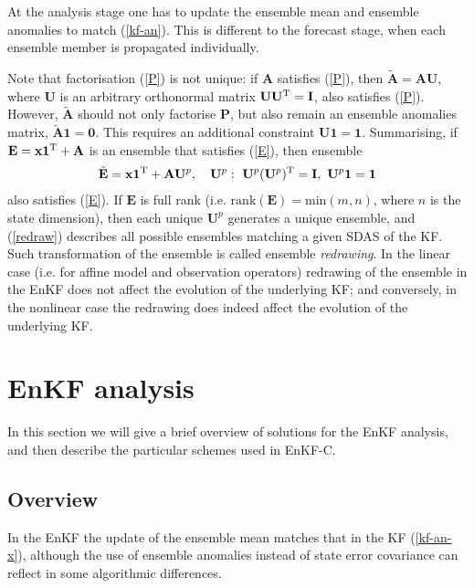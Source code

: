 \documentclass[11pt]{report}
\newcommand{\mb} {\mathbf}
\newcommand{\T}{^{\tiny \mathrm T}}
\begin{document}
At the analysis stage one has to update the ensemble mean and ensemble anomalies to match (\ref{kf-an}).
This is different to the forecast stage, when each ensemble member is propagated individually.

Note that factorisation (\ref{P}) is not unique: if $\mb A$ satisfies (\ref{P}), then $\tilde {\mb A} = \mb A \mb U$, where $\mb U$ is an arbitrary orthonormal matrix $\mb U \mb U\T = \mb I$, also satisfies (\ref{P}).
However, $\tilde{\mb A}$ should not only factorise $\mb P$, but also remain an ensemble anomalies matrix, $\tilde{\mb A} \mb 1 = \mb 0$.
This requires an additional constraint $\mb U \mb 1 = \mb 1$.
Summarising, if $\mb E = \mb x \mb 1\T + \mb A$ is an ensemble that satisfies (\ref{E}), then ensemble
\begin{align}
  \label{redraw}
  \tilde{\mb E} = \mb x \mb 1\T + \mb A \mb U^p, \quad \mb U^p:\ \mb U^p (\mb U^p)\T = \mb I,\ \mb U^p \mb 1 = \mb 1
\end{align}
also satisfies (\ref{E}). 
If $\mb E$ is full rank (i.e. $\mathrm{rank}(\mb E) = \mathrm{min}(m, n)$, where $n$ is the state dimension), then each unique $\mb U^p$ generates a unique ensemble, and (\ref{redraw}) describes all possible ensembles matching a given SDAS of the KF.
Such transformation of the ensemble is called ensemble \emph{redrawing}.
In the linear case (i.e. for affine model and observation operators) redrawing of the ensemble in the EnKF does not affect the evolution of the underlying KF; and conversely, in the nonlinear case the redrawing does indeed affect the evolution of the underlying KF.

\section{EnKF analysis}

In this section we will give a brief overview of solutions for the EnKF analysis, and then describe the particular schemes used in EnKF-C.

\subsection{Overview}

In the EnKF the update of the ensemble mean matches that in the KF (\ref{kf-an-x}), although the use of ensemble anomalies instead of state error covariance can reflect in some algorithmic differences.
\end{document}

